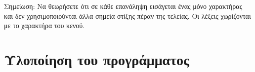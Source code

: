 \documentclass{assignment}
\begin{document}
Σημείωση: Να θεωρήσετε ότι σε κάθε επανάληψη εισάγεται ένας μόνο χαρακτήρας και δεν χρησιμοποιούνται άλλα σημεία στίξης πέραν της τελείας. Οι λέξεις χωρίζονται με το χαρακτήρα του κενού.

\section{Υλοποίηση του προγράμματος}

\inputminted[breaklines=true,linenos,tabsize=2]{java}{../../src/ads/Ads.java}




 \label{Βιβλιογραφία}



\newpage
\end{document}
